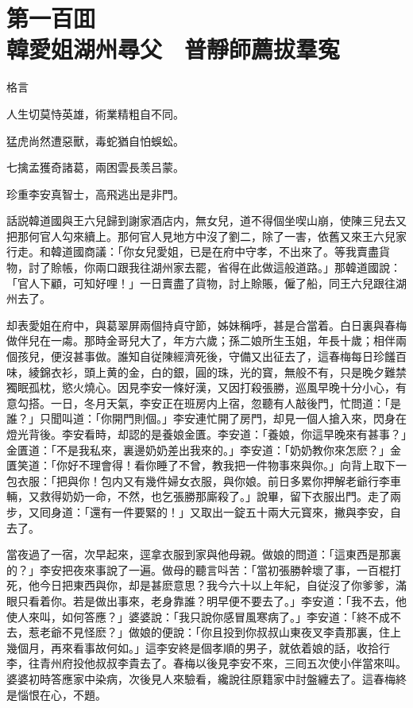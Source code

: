 
\chapter*{第一百囬　\\韓愛姐湖州尋父　普靜師薦拔羣寃}


格言
\begin{myquote}
人生切莫恃英雄，術業精粗自不同。

猛虎尚然遭惡獸，毒蛇猶自怕蜈蚣。

七擒孟獲奇諸葛，兩困雲長羡吕蒙。

珍重李安真智士，高飛逃出是非門。
\end{myquote}

話説韓道國與王六兒歸到謝家酒店内，無女兒，道不得個坐喫山崩，使陳三兒去又把那何官人勾來續上。那何官人見地方中沒了劉二，除了一害，依舊又來王六兒家行走。和韓道國商議：「你女兒愛姐，已是在府中守孝，不出來了。等我賣盡貨物，討了賒帳，你兩口跟我往湖州家去罷，省得在此做這般道路。」那韓道國說：「官人下顧，可知好哩！」一日賣盡了貨物，討上賒賬，僱了船，同王六兒跟往湖州去了。

却表愛姐在府中，與葛翠屏兩個持貞守節，姊妹稱呼，甚是合當着。白日裏與春梅做伴兒在一䖏。那時金哥兒大了，年方六歲；孫二娘所生玉姐，年長十歲；相伴兩個孩兒，便沒甚事做。誰知自従陳經濟死後，守備又出征去了，這春梅每日珍饈百味，綾錦衣衫，頭上黄的金，白的銀，圓的珠，光的寳，無般不有，只是晚夕難禁獨眠孤枕，慾火燒心。因見李安一條好漢，又因打殺張勝，巡風早晚十分小心，有意勾搭。一日，冬月天氣，李安正在班房内上宿，忽聽有人敲後門，忙問道：「是誰？」只聞叫道：「你開門則個。」李安連忙開了房門，却見一個人搶入來，閃身在燈光背後。李安看時，却認的是養娘金匱。李安道：「養娘，你這早晚來有甚事？」金匱道：「不是我私來，裏邊奶奶差出我來的。」李安道：「奶奶教你來怎麽？」金匱笑道：「你好不理會得！看你睡了不曾，教我把一件物事來與你。」向背上取下一包衣服：「把與你！包内又有幾件婦女衣服，與你娘。前日多累你押解老爺行李車輛，又救得奶奶一命，不然，也乞張勝那廝殺了。」說畢，留下衣服出門。走了兩步，又囘身道：「還有一件要緊的！」又取出一錠五十兩大元寳來，撇與李安，自去了。

當夜過了一宿，次早起來，逕拿衣服到家與他母親。做娘的問道：「這東西是那裏的？」李安把夜來事說了一遍。做母的聽言呌苦：「當初張勝幹壞了事，一百棍打死，他今日把東西與你，却是甚麽意思？我今六十以上年紀，自従沒了你爹爹，滿眼只看着你。若是做出事來，老身靠誰？明早便不要去了。」李安道：「我不去，他使人來叫，如何答應？」婆婆說：「我只說你感冒風寒病了。」李安道：「終不成不去，惹老爺不見怪麽？」做娘的便說：「你且投到你叔叔山東夜叉李貴那裏，住上幾個月，再來看事故何如。」這李安終是個孝順的男子，就依着娘的話，收拾行李，往青州府投他叔叔李貴去了。春梅以後見李安不來，三囘五次使小伴當來叫。婆婆初時答應家中染病，次後見人來驗看，纔說往原籍家中討盤纏去了。這春梅終是惱恨在心，不題。

